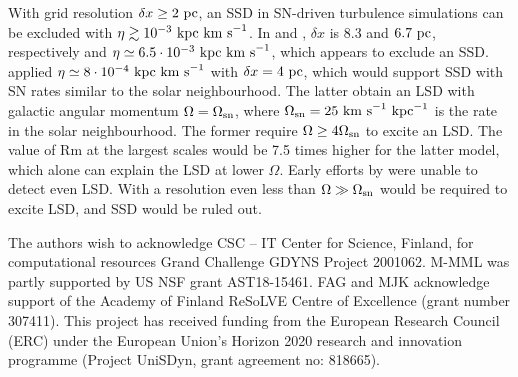 \documentclass[preprint2]{aastex63}
\newcommand\OSN{\Omega_{\rm sn}}
\newcommand\kpc{~ {\rm kpc}}
\newcommand\pc{~ {\rm pc}}
\newcommand\dx{ {\delta x}}
\newcommand\kms{~ {\rm km~ s}^{-1}}
\begin{document}
 With grid resolution $\dx\geq2\pc$, an SSD in SN-driven turbulence simulations
 can be excluded with $\eta\gtrsim10^{-3}\kpc\kms$.
 In \citet{Gressel:2008} and \citet{GE20}, $\dx$ is 8.3 and $6.7\pc$,
 respectively and $\eta\simeq6.5\cdot10^{-3}\kpc\kms$, which appears to exclude
 an SSD.
 \citet{Gent:2013b} applied $\eta\simeq8\cdot10^{-4}\kpc\kms$ with $\dx=4\pc$,
 which would support SSD with SN rates similar to the solar neighbourhood.
 The latter obtain an LSD with galactic angular momentum $\Omega=\OSN$, where
 $\OSN=25\kms\kpc^{-1}$ is the rate in the solar neighbourhood.
 The former require $\Omega\geq4\OSN$ to excite an LSD.
 The value of Rm at the largest scales would be 7.5 times higher for the latter
 model, which alone can explain the LSD at lower $\Omega$.
 Early efforts by \citet{Korpi:1999b} were unable to detect even LSD.
 With a resolution even less than \citet{Gressel:2008} $\Omega\gg\OSN$ would
 be required to excite LSD, and SSD would be ruled out.

\acknowledgments
The authors wish to acknowledge CSC – IT Center for Science, Finland, for
computational resources Grand Challenge GDYNS Project 2001062.
M-MML was partly supported by US NSF grant AST18-15461.
FAG and MJK acknowledge support of the Academy of Finland
ReSoLVE Centre of Excellence (grant number 307411).
This project has received funding from the European Research Council (ERC)
under the European Union's Horizon 2020 research and innovation
programme (Project UniSDyn, grant agreement no: 818665).

{}

\end{document}
